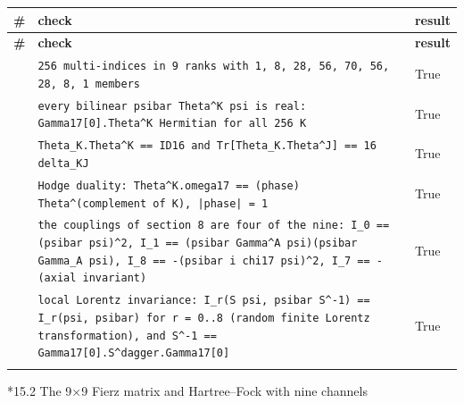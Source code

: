 \documentclass[10pt,a4paper]{article}
\makeatletter
\renewcommand\subsubsection{\@startsection{subsubsection}{3}{\z@}{-3.25ex\@plus -1ex \@minus -.2ex}{1.5ex \@plus .2ex}{\normalfont\normalsize\bfseries\raggedright}}
\makeatother
\begin{document}
{\footnotesize
\begin{longtable}{>{\raggedright\arraybackslash}p{}>{\raggedright\arraybackslash}p{}>{\raggedright\arraybackslash}p{}}
\toprule
\textbf{\#} & \textbf{check} & \textbf{result} \\
\midrule\endfirsthead
\toprule
\textbf{\#} & \textbf{check} & \textbf{result} \\
\midrule\endhead
\endfoot
\bottomrule\endlastfoot
304 & \texttt{256 multi-indices in 9 ranks with 1, 8, 28, 56, 70, 56, 28, 8, 1 members} & True \\
305 & \texttt{every bilinear psibar Theta\textasciicircum{}K psi is real: Gamma17[0].Theta\textasciicircum{}K Hermitian for all 256 K} & True \\
306 & \texttt{Theta\_\allowbreak{}K.Theta\textasciicircum{}K == ID16 and Tr[Theta\_\allowbreak{}K.Theta\textasciicircum{}J] == 16 delta\_\allowbreak{}KJ} & True \\
307 & \texttt{Hodge duality: Theta\textasciicircum{}K.omega17 == (phase) Theta\textasciicircum{}(complement of K), |phase| = 1} & True \\
308 & \texttt{the couplings of section 8 are four of the nine: I\_\allowbreak{}0 == (psibar psi)\textasciicircum{}2, I\_\allowbreak{}1 == (psibar Gamma\textasciicircum{}A psi)(psibar Gamma\_\allowbreak{}A psi), I\_\allowbreak{}8 == -(psibar i chi17 psi)\textasciicircum{}2, I\_\allowbreak{}7 == -(axial invariant)} & True \\
309 & \texttt{local Lorentz invariance: I\_\allowbreak{}r(S psi, psibar S\textasciicircum{}-1) == I\_\allowbreak{}r(psi, psibar) for r = 0..8 (random finite Lorentz transformation), and S\textasciicircum{}-1 == Gamma17[0].S\textasciicircum{}dagger.Gamma17[0]} & True \\*
\end{longtable}}
\subsubsection*{15.2 The 9×9 Fierz matrix and Hartree–Fock with nine channels}
\end{document}
